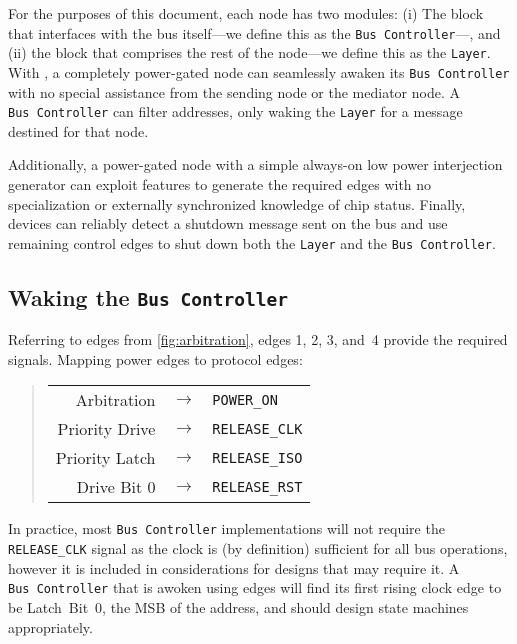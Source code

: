 For the purposes of this document, each \bus node has two modules: (i) The
block that interfaces with the bus itself---we define this as the {\tt Bus
Controller}---, and (ii) the block that comprises the rest of the node---we
define this as the {\tt Layer}. With \bus, a completely power-gated node can
seamlessly awaken its {\tt Bus~Controller} with no special assistance from the
sending node or the mediator node. A {\tt Bus~Controller} can filter addresses,
only waking the {\tt Layer} for a message destined for that node.

Additionally, a power-gated node with a simple always-on low power
interjection generator can exploit \bus features to generate the required
edges with no specialization or externally synchronized knowledge of chip
status. Finally, devices can reliably detect a shutdown message sent on the
bus and use remaining control edges to shut down both the {\tt Layer} and the
{\tt Bus~Controller}.

\subsection{Waking the \texttt{Bus~Controller}}
\label{sec:power-bus-controller-wakeup}
Referring to edges from \cref{fig:arbitration}, edges 1, 2, 3, and~4
provide the required signals. Mapping power edges to \bus protocol edges:

\begin{quote}
\begin{tabular}{r c l}
  Arbitration    & $\rightarrow$ & {\tt POWER\_ON} \\
  Priority Drive & $\rightarrow$ & {\tt RELEASE\_CLK} \\
  Priority Latch & $\rightarrow$ & {\tt RELEASE\_ISO} \\
  Drive Bit 0    & $\rightarrow$ & {\tt RELEASE\_RST} \\
\end{tabular}
\end{quote}

In practice, most {\tt Bus~Controller} implementations will not require the
{\tt RELEASE\_CLK} signal as the \bus clock is (by definition) sufficient for
all bus operations, however it is included in considerations for designs that
may require it. A {\tt Bus~Controller} that is awoken using \bus edges will
find its first rising clock edge to be Latch~Bit~0, the MSB of the address,
and should design state machines appropriately.

